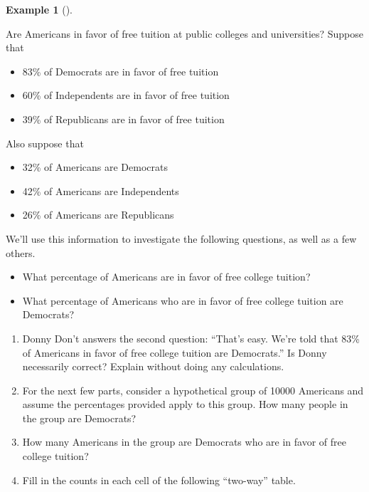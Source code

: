 \documentclass[
  letterpaper,
  DIV=11,
  numbers=noendperiod]{scrreprt}
\providecommand{\tightlist}{%
  \setlength{\itemsep}{0pt}\setlength{\parskip}{0pt}}
\theoremstyle{plain}
\theoremstyle{definition}
\newtheorem{example}{Example}[chapter]
\theoremstyle{definition}
\theoremstyle{definition}
\theoremstyle{remark}
\begin{document}
\begin{tcolorbox}[enhanced jigsaw, opacityback=0, left=2mm, colframe=quarto-callout-note-color-frame, toprule=.15mm, breakable, colback=white, leftrule=.75mm, arc=.35mm, rightrule=.15mm, bottomrule=.15mm]

\begin{example}[]\protect\hypertarget{exm-free-college-twoway}{}\label{exm-free-college-twoway}

Are Americans in favor of free tuition at public colleges and
universities? Suppose that\footnotemark{}

\begin{itemize}
\tightlist
\item
  83\% of Democrats are in favor of free tuition
\item
  60\% of Independents are in favor of free tuition
\item
  39\% of Republicans are in favor of free tuition
\end{itemize}

Also suppose that\footnotemark{}

\begin{itemize}
\tightlist
\item
  32\% of Americans are Democrats
\item
  42\% of Americans are Independents
\item
  26\% of Americans are Republicans
\end{itemize}

We'll use this information to investigate the following questions, as
well as a few others.

\begin{itemize}
\tightlist
\item
  What percentage of Americans are in favor of free college tuition?
\item
  What percentage of Americans who are in favor of free college tuition
  are Democrats?
\end{itemize}

\begin{enumerate}
\def\labelenumi{\arabic{enumi}.}
\item
  Donny Don't answers the second question: ``That's easy. We're told
  that 83\% of Americans in favor of free college tuition are
  Democrats.'' Is Donny necessarily correct? Explain without doing any
  calculations.
\item
  For the next few parts, consider a hypothetical group of 10000
  Americans and assume the percentages provided apply to this group. How
  many people in the group are Democrats?
\item
  How many Americans in the group are Democrats who are in favor of free
  college tuition?
\item
  Fill in the counts in each cell of the following ``two-way'' table.


\end{enumerate}
\end{example}
\end{tcolorbox}
\end{document}
